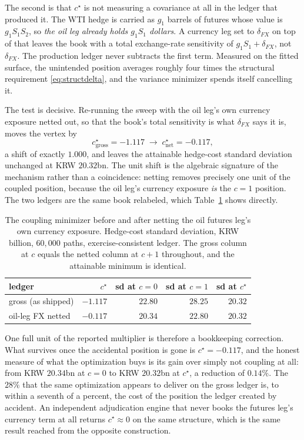 \documentclass[11pt,a4paper]{article}
\begin{document}
The second is that $c^\star$ is not measuring a covariance at all in the ledger that produced it. The WTI hedge is carried as $g_1$ barrels of futures whose value is $g_1S_1S_2$, so \emph{the oil leg already holds $g_1S_1$ dollars}. A currency leg set to $\delta_{FX}$ on top of that leaves the book with a total exchange-rate sensitivity of $g_1S_1+\delta_{FX}$, not $\delta_{FX}$. The production ledger never subtracts the first term. Measured on the fitted surface, the unintended position averages roughly four times the structural requirement \eqref{eq:structdelta}, and the variance minimizer spends itself cancelling it.

The test is decisive. Re-running the sweep with the oil leg's own currency exposure netted out, so that the book's total sensitivity is what $\delta_{FX}$ says it is, moves the vertex by
\begin{equation}
c^\star_{\text{gross}} = -1.117 \;\longrightarrow\; c^\star_{\text{net}} = -0.117,
\label{eq:cstarnet}
\end{equation}
a shift of exactly $1.000$, and leaves the attainable hedge-cost standard deviation unchanged at KRW $20.32$bn. The unit shift is the algebraic signature of the mechanism rather than a coincidence: netting removes precisely one unit of the coupled position, because the oil leg's currency exposure \emph{is} the $c=1$ position. The two ledgers are the same book relabeled, which Table~\ref{tab:netshift} shows directly.

\begin{table}[h]
\centering
\small
\begin{tabular}{lrrrr}
\toprule
ledger & $c^\star$ & sd at $c=0$ & sd at $c=1$ & sd at $c^\star$ \\
\midrule
gross (as shipped) & $-1.117$ & $22.80$ & $28.25$ & $20.32$ \\
oil-leg FX netted  & $-0.117$ & $20.34$ & $22.80$ & $20.32$ \\
\bottomrule
\end{tabular}
\caption{The coupling minimizer before and after netting the oil futures leg's own currency exposure. Hedge-cost standard deviation, KRW billion, $60{,}000$ paths, exercise-consistent ledger. The gross column at $c$ equals the netted column at $c+1$ throughout, and the attainable minimum is identical.}
\label{tab:netshift}
\end{table}

\noindent One full unit of the reported multiplier is therefore a bookkeeping correction. What survives once the accidental position is gone is $c^\star=-0.117$, and the honest measure of what the optimization buys is its gain over simply not coupling at all: from KRW $20.34$bn at $c=0$ to KRW $20.32$bn at $c^\star$, a reduction of $0.14\%$. The $28\%$ that the same optimization appears to deliver on the gross ledger is, to within a seventh of a percent, the cost of the position the ledger created by accident. An independent adjudication engine that never books the futures leg's currency term at all returns $c^\star\approx0$ on the same structure, which is the same result reached from the opposite construction.
\end{document}
